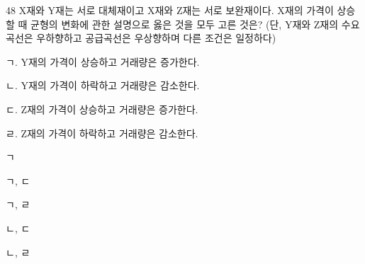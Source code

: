 \begin{question}{48}
X재와 Y재는 서로 대체재이고 X재와 Z재는 서로 보완재이다. X재의 가격이 상승할 때 균형의 변화에 관한 설명으로 옳은 것을 모두 고른 것은? (단, Y재와 Z재의 수요곡선은 우하향하고 공급곡선은 우상향하며 다른 조건은 일정하다)
\begin{framedtext}
ㄱ. Y재의 가격이 상승하고 거래량은 증가한다. \par
ㄴ. Y재의 가격이 하락하고 거래량은 감소한다. \par
ㄷ. Z재의 가격이 상승하고 거래량은 증가한다. \par
ㄹ. Z재의 가격이 하락하고 거래량은 감소한다.
\end{framedtext}
\begin{choices}
  \item ㄱ
  \item ㄱ, ㄷ
  \item ㄱ, ㄹ
  \item ㄴ, ㄷ
  \item ㄴ, ㄹ
\end{choices}
\end{question}
